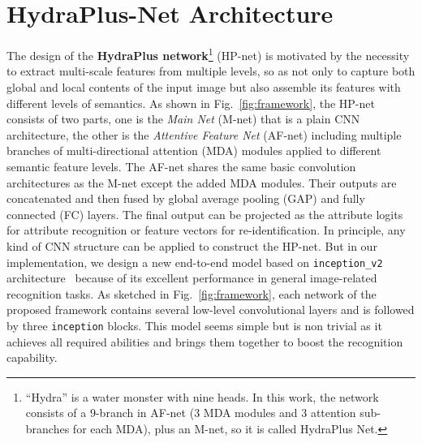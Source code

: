 \documentclass[10pt,twocolumn,letterpaper]{article}
\begin{document}
\section{HydraPlus-Net Architecture}
\label{sec:multi_attention}
\vspace{-0.1cm}
%
The design of the \textbf{HydraPlus network}\footnote{“Hydra” is a water monster with nine heads. In this work, the network consists of a 9-branch in AF-net (3 MDA modules and 3 attention sub-branches for each MDA), plus an M-net, so it is called HydraPlus Net.} (HP-net) is motivated by the necessity to extract multi-scale features from multiple levels, so as not only to capture both global and local contents of the input image but also assemble its features with different levels of semantics.
%
%
%
As shown in Fig.~\ref{fig:framework}, the HP-net consists of two parts, one is the \textit{Main Net} (M-net) that is a plain CNN architecture, the other is the \textit{Attentive Feature Net} (AF-net) including multiple branches of multi-directional attention (MDA) modules applied to different semantic feature levels.
%
The AF-net shares the same basic convolution architectures as the M-net except the added MDA modules.
%
Their outputs are concatenated and then fused by global average pooling (GAP) and fully connected (FC) layers. The final output can be projected as the attribute logits for attribute recognition or feature vectors for re-identification.
%
In principle, any kind of CNN structure can be applied to construct the HP-net.
%
But in our implementation, we design a new end-to-end model based on \texttt{inception\_v2} architecture~\cite{ioffe2015batch} because of its excellent performance in general image-related recognition tasks.
%
As sketched in Fig.~\ref{fig:framework}, each network of the proposed framework contains several low-level convolutional layers and is followed by three \texttt{inception} blocks.
%
%
This model seems simple but is non trivial as it achieves all required abilities and brings them together to boost the recognition capability.
\end{document}
